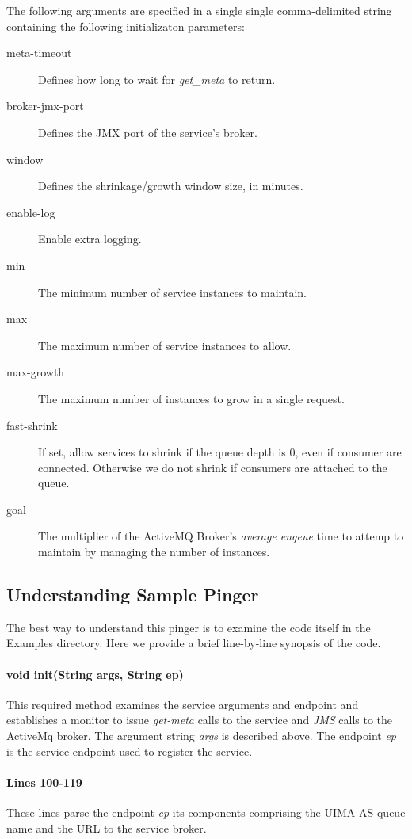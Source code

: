     The following arguments are specified in a single single comma-delimited
    string containing the following initializaton parameters:
    \begin{description}
      \item[meta-timeout] Defines how long to wait for {\em get\_meta} to return.
      \item[broker-jmx-port] Defines the JMX port of the service's broker.
      \item[window] Defines the shrinkage/growth window size, in minutes.
      \item[enable-log] Enable extra logging.
      \item[min] The minimum number of service instances to maintain.
      \item[max] The maximum number of service instances to allow.
      \item[max-growth] The maximum number of instances to grow in a
        single request.
      \item[fast-shrink] If set, allow services to shrink if the
        queue depth is 0, even if consumer are connected.  Otherwise
        we do not shrink if consumers are attached to the queue.
      \item[goal] The multiplier of the ActiveMQ Broker's {\em average enqeue}
        time to attemp to maintain by managing the number of instances.
    \end{description}

    
    \subsection{Understanding  Sample Pinger}

    The best way to understand this pinger is to examine the code itself in the
    Examples directory.  Here we provide a brief line-by-line synopsis of the code.

    \paragraph{void init(String args, String ep)}
    This required method examines the service arguments and endpoint and establishes a monitor
    to issue {\em get-meta} calls to the service and {\em JMS} calls to the 
    ActiveMq broker.  The argument string {\em args} is described above.  The
    endpoint {\em ep} is the service endpoint used to register the service.

    \paragraph{Lines 100-119}
    These lines parse the endpoint {\em ep} its components comprising the
    UIMA-AS queue name and the URL to the service broker.

